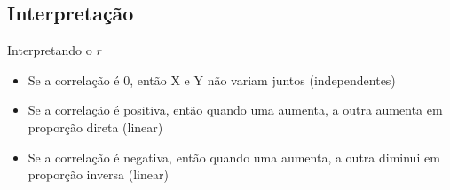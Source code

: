 \documentclass{beamer}
\begin{document}

    

    


\subsection{Interpretação}

\begin{frame}{\scriptsize Interpretando o $r$}
  \begin{itemize}
    \footnotesize
  \item Se a correlação é 0, então X e Y não variam juntos (independentes)
  \item Se a correlação é positiva, então quando uma aumenta, a outra
    aumenta em proporção direta (linear)
  \item Se a correlação é negativa, então quando uma aumenta, a outra
    diminui em proporção inversa (linear)
  \end{itemize}
\end{frame}
\end{document}
